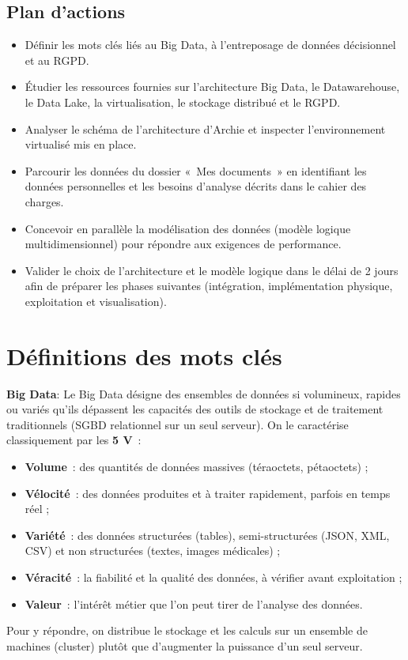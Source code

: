 \subsection*{Plan d'actions}
{}
\begin{itemize}
	\item Définir les mots clés liés au Big Data, à l'entreposage de données décisionnel et au RGPD.
	\item Étudier les ressources fournies sur l'architecture Big Data, le Datawarehouse, le Data Lake, la virtualisation, le stockage distribué et le RGPD.
	\item Analyser le schéma de l'architecture d'Archie et inspecter l'environnement virtualisé mis en place.
	\item Parcourir les données du dossier «~Mes documents~» en identifiant les données personnelles et les besoins d'analyse décrits dans le cahier des charges.
	\item Concevoir en parallèle la modélisation des données (modèle logique multidimensionnel) pour répondre aux exigences de performance.
	\item Valider le choix de l'architecture et le modèle logique dans le délai de 2 jours afin de préparer les phases suivantes (intégration, implémentation physique, exploitation et visualisation).
\end{itemize}

\newpage
\newpage
\section{Définitions des mots clés}

\noindent \textbf{Big Data}:
\noindent Le Big Data désigne des ensembles de données si volumineux, rapides ou variés qu'ils dépassent les capacités des outils de stockage et de traitement traditionnels (SGBD relationnel sur un seul serveur). On le caractérise classiquement par les \textbf{5 V}~:
\begin{itemize}
	\item \textbf{Volume}~: des quantités de données massives (téraoctets, pétaoctets) ;
	\item \textbf{Vélocité}~: des données produites et à traiter rapidement, parfois en temps réel ;
	\item \textbf{Variété}~: des données structurées (tables), semi-structurées (JSON, XML, CSV) et non structurées (textes, images médicales) ;
	\item \textbf{Véracité}~: la fiabilité et la qualité des données, à vérifier avant exploitation ;
	\item \textbf{Valeur}~: l'intérêt métier que l'on peut tirer de l'analyse des données.
\end{itemize}
Pour y répondre, on distribue le stockage et les calculs sur un ensemble de machines (cluster) plutôt que d'augmenter la puissance d'un seul serveur.

